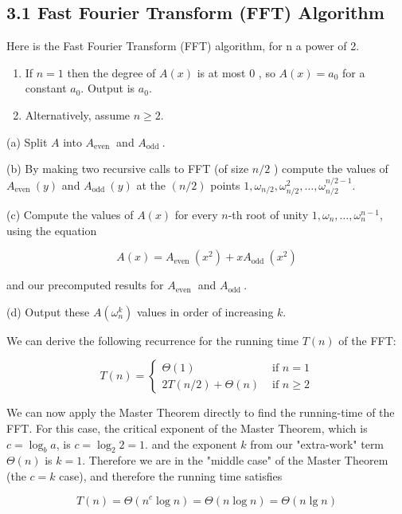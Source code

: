\subsection*{3.1 Fast Fourier Transform (FFT) Algorithm}
Here is the Fast Fourier Transform (FFT) algorithm, for $\mathrm{n}$ a power of 2.

\begin{enumerate}
  \item If $n=1$ then the degree of $A(x)$ is at most 0 , so $A(x)=a_{0}$ for a constant $a_{0}$. Output is $a_{0}$.

  \item Alternatively, assume $n \geq 2$.

\end{enumerate}

(a) Split $A$ into $A_{\text {even }}$ and $A_{\text {odd }}$.

(b) By making two recursive calls to FFT (of size $n / 2$ ) compute the values of $A_{\text {even }}(y)$ and $A_{\text {odd }}(y)$ at the $(n / 2)$ points $1, \omega_{n / 2}, \omega_{n / 2}^{2}, \ldots, \omega_{n / 2}^{n / 2-1}$.

(c) Compute the values of $A(x)$ for every $n$-th root of unity $1, \omega_{n}, \ldots, \omega_{n}^{n-1}$, using the equation

$$
A(x)=A_{\text {even }}\left(x^{2}\right)+x A_{\text {odd }}\left(x^{2}\right)
$$

and our precomputed results for $A_{\text {even }}$ and $A_{\text {odd }}$.

(d) Output these $A\left(\omega_{n}^{k}\right)$ values in order of increasing $k$.

We can derive the following recurrence for the running time $T(n)$ of the FFT:

$$
T(n)=\left\{\begin{array}{cc}
\Theta(1) & \text { if } n=1 \\
2 T(n / 2)+\Theta(n) & \text { if } n \geq 2
\end{array}\right.
$$

We can now apply the Master Theorem directly to find the running-time of the FFT. For this case, the critical exponent of the Master Theorem, which is $c=\log _{b} a$, is $c=\log _{2} 2=1$. and the exponent $k$ from our "extra-work" term $\Theta(n)$ is $k=1$. Therefore we are in the "middle case" of the Master Theorem (the $c=k$ case), and therefore the running time satisfies

$$
T(n)=\Theta\left(n^{c} \log n\right)=\Theta(n \log n)=\Theta(n \lg n)
$$

